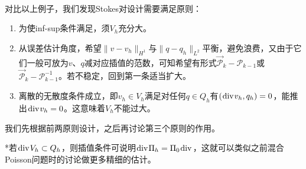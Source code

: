 \documentclass[a4paper,UTF8,fontset=windows]{ctexart}
\newcommand*{\cp}{\mathcal{P}}
\renewcommand*{\div}{\hspace{0.07em}\mathrm{div}\hspace{0.07em}}
\begin{document}
\

对比以上例子，我们发现Stokes对设计需要满足原则：
\begin{enumerate}
    \item 为使inf-sup条件满足，须$V_h$充分大。
    \item 从误差估计角度，希望$\|v-v_h\|_{H^1}$与$\|q-q_h\|_{L^2}$平衡，避免浪费，又由于它们一般可放为$v$、$q$减对应插值的范数，可知希望有形式$\vec{\cp}_k-\cp_{k-1}$或$\vec{\cp}_k-\cp_{k-1}^{-1}$。若不稳定，回到第一条适当扩大。
    \item 离散的无散度条件成立，即$v_h\in V_h$满足对任何$q\in Q_h$有$(\div v_h,q_h)=0$，能推出$\div v_h=0$。这意味着$V_h$不能过大。
\end{enumerate}

我们先根据前两原则设计，之后再讨论第三个原则的作用。

*若$\div V_h\subset Q_h$，则插值条件可说明$\div\Pi_h=\Pi_0\div$，这就可以类似之前混合Poisson问题时的讨论做更多精细的估计。
\end{document}

